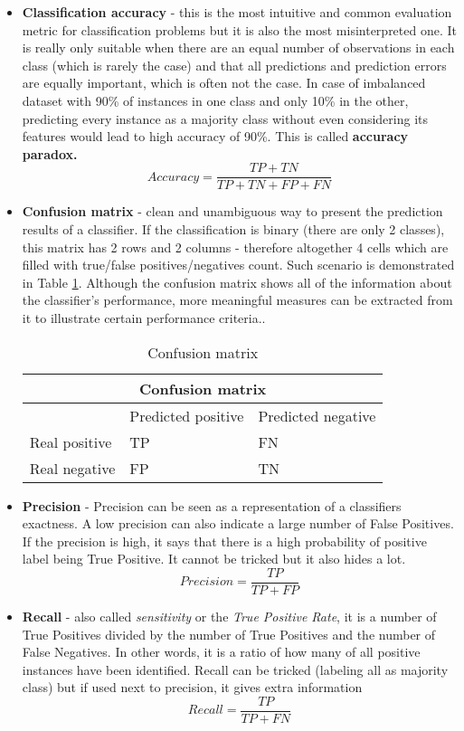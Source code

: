 \begin{itemize}
\item \textbf{Classification accuracy} - this is the most intuitive and common evaluation metric for classification problems but it is also the most misinterpreted one. It is really only suitable when there are an equal number of observations in each class (which is rarely the case) and that all predictions and prediction errors are equally important, which is often not the case. In case of imbalanced dataset with 90\% of instances in one class and only 10\% in the other, predicting every instance as a majority class without even considering its features would lead to high accuracy of 90\%. This is called \textbf{accuracy paradox.}
\[ Accuracy = \frac{TP + TN}{TP + TN + FP + FN}\]
\item \textbf{Confusion matrix} - clean and unambiguous way to present the prediction results of a classifier. If the classification is binary (there are only 2 classes), this matrix has 2 rows and 2 columns - therefore altogether 4 cells which are filled with true/false positives/negatives count. Such scenario is demonstrated in Table \ref{table:Confusion_matrix_general}. Although the confusion matrix shows all of the information about the classifier's performance, more meaningful measures can be extracted from it to illustrate certain performance criteria.\cite{bradley1997use}. 
\begin{table}[H]
{
\centering
\begin{tabular}{ |p{4cm}|p{4cm}|p{4cm}|  }
 \hline
 \multicolumn{3}{|c|}{Confusion matrix} \\
 \hline
  & Predicted positive & Predicted negative\\
 \hline
 Real positive   & TP    &FN\\ \hline
 Real negative &   FP  & TN\\ \hline
\end{tabular}
}
\caption{Confusion matrix}
\label{table:Confusion_matrix_general}
\end{table}

\item \textbf{Precision} - Precision can be seen as a representation of a classifiers exactness. A low precision can also indicate a large number of False Positives. If the precision is high, it says that there is a high probability of positive label being True Positive. It cannot be tricked but it also hides a lot.
\[ Precision = \frac{TP}{TP + FP}\]
\item \textbf{Recall} - also called \textit{sensitivity} or the \textit{True Positive Rate}, it is a number of True Positives divided by the number of True Positives and the number of False Negatives. In other words, it is a ratio of how many of all positive instances have been identified. Recall can be tricked (labeling all as majority class) but if used next to precision, it gives extra information
\[ Recall = \frac{TP}{TP + FN}\]
\end{itemize}
